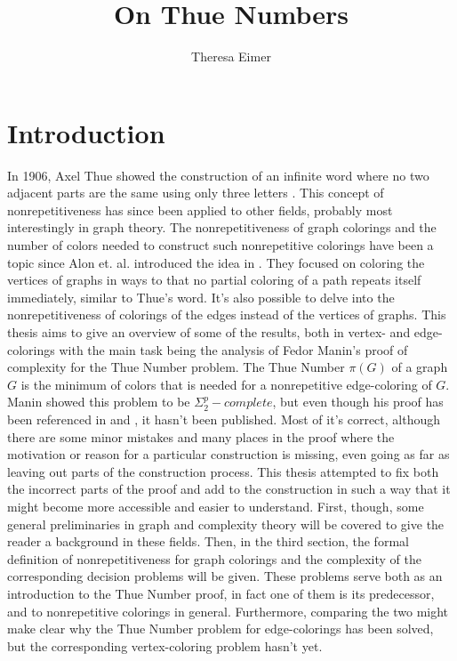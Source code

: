 \documentclass[12pt,a4paper]{article}
\author{Theresa Eimer}
\title{On Thue Numbers}
\date{}
\begin{document}
\renewcommand{\figurename}{Fig.}

\thispagestyle{empty}
\newpage
\tableofcontents
\thispagestyle{empty}
\newpage

\section{Introduction}
In 1906, Axel Thue showed the construction of an infinite word where no two adjacent parts are the same using only three letters \citep{Thue1906}. This concept of nonrepetitiveness has since been applied to other fields, probably most interestingly in graph theory. The nonrepetitiveness of graph colorings and the number of colors needed to construct such nonrepetitive colorings have been a topic since Alon et. al. introduced the idea in \citep{Alon2002}. They focused on coloring the vertices of graphs in ways to that no partial coloring of a path repeats itself immediately, similar to Thue's word. It's also possible to delve into the nonrepetitiveness of colorings of the edges instead of the vertices of graphs. This thesis aims to give an overview of some of the results, both in vertex- and edge-colorings with the main task being the analysis of Fedor Manin's proof of complexity for the Thue Number problem. The Thue Number $\pi(G)$ of a graph $G$ is the minimum of colors that is needed for a nonrepetitive edge-coloring of $G$. Manin showed this problem to be $\Sigma^p_2-complete$, but even though his proof has been referenced in \citep{Marx2009} and \citep{Schaefer2002}, it hasn't been published. Most of it's correct, although there are some minor mistakes and many places in the proof where the motivation or reason for a particular construction is missing, even going as far as leaving out parts of the construction process. This thesis attempted to fix both the incorrect parts of the proof and add to the construction in such a way that it might become more accessible and easier to understand.
\newline
First, though, some general preliminaries in graph and complexity theory will be covered to give the reader a background in these fields.
\newline
Then, in the third section, the formal definition of nonrepetitiveness for graph colorings and the complexity of the corresponding decision problems will be given. These problems serve both as an introduction to the Thue Number proof, in fact one of them is its predecessor, and to nonrepetitive colorings in general. Furthermore, comparing the two might make clear why the Thue Number problem for edge-colorings has been solved, but the corresponding vertex-coloring problem hasn't yet.
\end{document}
